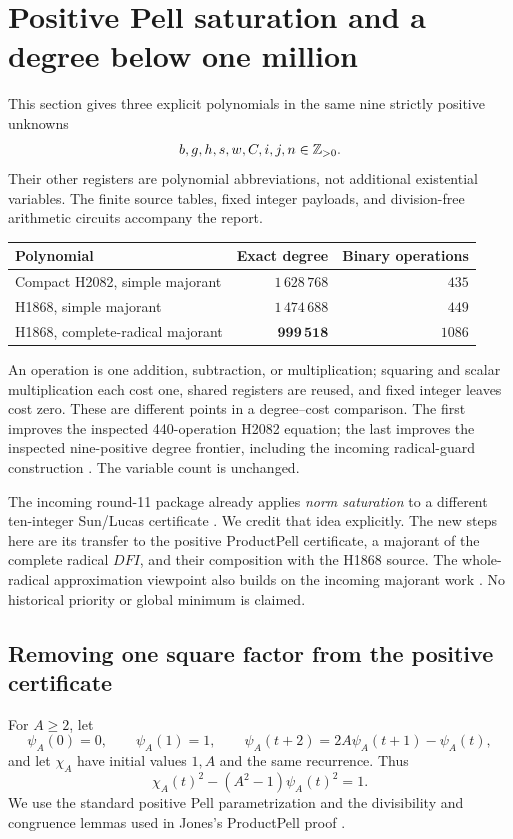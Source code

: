 \section{Positive Pell saturation and a degree below one million}
\label{sec:nine-saturation}

This section gives three explicit polynomials in the same nine strictly
positive unknowns
\[
 b,g,h,s,w,C,i,j,n\in\mathbb Z_{>0}.
\]
Their other registers are polynomial abbreviations, not additional
existential variables. The finite source tables, fixed integer payloads,
and division-free arithmetic circuits accompany the report.
\begin{center}
\begin{tabular}{lrr}
\hline
Polynomial & Exact degree & Binary operations\\
\hline
Compact H2082, simple majorant & \(1\,628\,768\) & \(435\)\\
H1868, simple majorant & \(1\,474\,688\) & \(449\)\\
H1868, complete-radical majorant & \(\mathbf{999\,518}\) & \(1086\)\\
\hline
\end{tabular}
\end{center}
An operation is one addition, subtraction, or multiplication; squaring and
scalar multiplication each cost one, shared registers are reused, and fixed
integer leaves cost zero. These are different points in a degree--cost
comparison. The first improves the inspected 440-operation H2082 equation;
the last improves the inspected nine-positive degree frontier, including the
incoming radical-guard construction \cite{repo,radical,reportincoming}.
The variable count is unchanged.

The incoming round-11 package already applies \emph{norm saturation} to a
different ten-integer Sun/Lucas certificate \cite{round11}. We credit that
idea explicitly. The new steps here are its transfer to the positive
ProductPell certificate, a majorant of the complete radical \(DFI\), and their
composition with the H1868 source. The whole-radical approximation viewpoint
also builds on the incoming majorant work \cite{radical,reportincoming}.
No historical priority or global minimum is claimed.

\subsection{Removing one square factor from the positive certificate}

For \(A\ge2\), let
\[
 \psi_A(0)=0,\qquad \psi_A(1)=1,\qquad
 \psi_A(t+2)=2A\psi_A(t+1)-\psi_A(t),
\]
and let \(\chi_A\) have initial values \(1,A\) and the same recurrence.
Thus
\[
 \chi_A(t)^2-(A^2-1)\psi_A(t)^2=1.
\]
We use the standard positive Pell parametrization and the divisibility and
congruence lemmas used in Jones's ProductPell proof \cite{jones,productpell}.

